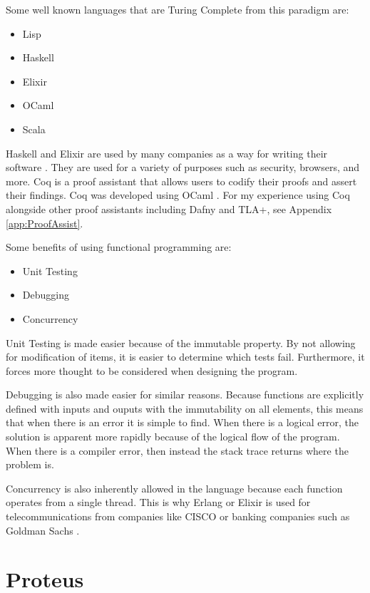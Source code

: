 Some well known languages that are Turing Complete from this paradigm are:  
\begin{itemize}
    \item Lisp
    \item Haskell
    \item Elixir
    \item OCaml
    \item Scala
\end{itemize}

Haskell and Elixir are used by many companies as a way for writing their software \cite{HaskellList,HaskellListReadme,ElixirList,ElixirListReadme}.
They are used for a variety of purposes such as security, browsers, and more.
Coq is a proof assistant that allows users to codify their proofs and assert their findings.
Coq was developed using OCaml \cite{OCamlCoq}.
For my experience using Coq alongside other proof assistants including Dafny and TLA+, see Appendix \ref{app:ProofAssist}.

Some benefits of using functional programming are:
\begin{itemize}
    \item Unit Testing
    \item Debugging
    \item Concurrency
\end{itemize}

Unit Testing is made easier because of the immutable property.
By not allowing for modification of items, it is easier to determine which tests fail.
Furthermore, it forces more thought to be considered when designing the program.

Debugging is also made easier for similar reasons.
Because functions are explicitly defined with inputs and ouputs with the immutability on all elements, this means that when there is an error it is simple to find.
When there is a logical error, the solution is apparent more rapidly because of the logical flow of the program.
When there is a compiler error, then instead the stack trace returns where the problem is.

Concurrency is also inherently allowed in the language because each function operates from a single thread.
This is why Erlang or Elixir is used for telecommunications from companies like CISCO or banking companies such as Goldman Sachs \cite{ErlangUses}.

\section{Proteus}\label{sec:Proteus}


